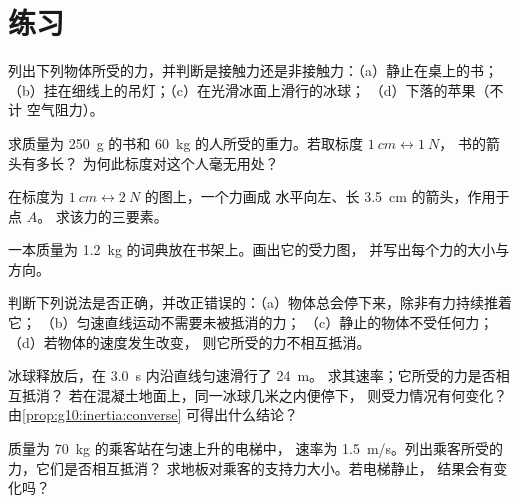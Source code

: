 \section{练习}

\begin{exercise}[$\star$]\label{exo:g10:inertia:1}
列出下列物体所受的力，并判断是接触力还是非接触力：（a）静止在桌上的书；
（b）挂在细线上的吊灯；（c）在光滑冰面上滑行的冰球；
（d）下落的苹果（不计
空气阻力）。
\end{exercise}

\begin{exercise}[$\star$]\label{exo:g10:inertia:2}
求质量为 \qty{250}{g} 的书和 \qty{60}{kg}
的人所受的重力。若取标度 $\qty{1}{cm} \leftrightarrow \qty{1}{N}$，
书的箭头有多长？
为何此标度对这个人毫无用处？
\end{exercise}

\begin{exercise}[$\star$]\label{exo:g10:inertia:3}
在标度为 $\qty{1}{cm} \leftrightarrow \qty{2}{N}$ 的图上，一个力画成
水平向左、长 \qty{3.5}{cm} 的箭头，作用于点 $A$。
求该力的三要素。
\end{exercise}

\begin{exercise}[$\star$]\label{exo:g10:inertia:4}
一本质量为 \qty{1.2}{kg} 的词典放在书架上。画出它的受力图，
并写出每个力的大小与方向。
\end{exercise}

\begin{exercise}[$\star$]\label{exo:g10:inertia:5}
判断下列说法是否正确，并改正错误的：（a）物体总会停下来，除非有力持续推着它；
（b）匀速直线运动不需要未被抵消的力；
（c）静止的物体不受任何力；
（d）若物体的速度发生改变，
则它所受的力不相互抵消。
\end{exercise}

\begin{exercise}[$\star\star$]\label{exo:g10:inertia:6}
冰球释放后，在 \qty{3.0}{s} 内沿直线匀速滑行了 \qty{24}{m}。
求其速率；它所受的力是否相互抵消？
若在混凝土地面上，同一冰球几米之内便停下，
则受力情况有何变化？由\cref{prop:g10:inertia:converse}
可得出什么结论？
\end{exercise}

\begin{exercise}[$\star\star$]\label{exo:g10:inertia:7}
质量为 \qty{70}{kg} 的乘客站在匀速上升的电梯中，
速率为 \qty{1.5}{m/s}。列出乘客所受的力，它们是否相互抵消？
求地板对乘客的支持力大小。若电梯静止，
结果会有变化吗？
\end{exercise}

